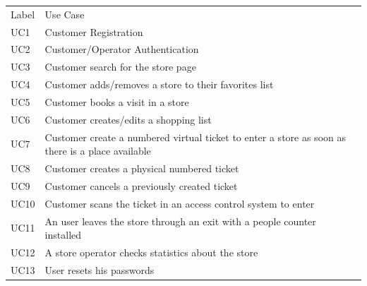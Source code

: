 \renewcommand{\arraystretch}{1.4}
\begin{tabular}{C{2cm}L{10.5cm}C{2.6cm}}
    Label & Use Case                                                                                         \\
    UC1   & Customer Registration                                                                            \\
    UC2   & Customer/Operator Authentication                                                                 \\
    UC3   & Customer search for the store page                                                               \\
    UC4   & Customer adds/removes a store to their favorites list                                            \\
    UC5   & Customer books a visit in a store                                                                \\
    UC6   & Customer creates/edits a shopping list                                                           \\
    UC7   & Customer create a numbered virtual ticket to enter a store as soon as there is a place available \\
    UC8   & Customer creates a physical numbered ticket                                                      \\
    UC9   & Customer cancels a previously created ticket                                                     \\
    UC10  & Customer scans the ticket in an access control system to enter                                   \\
    UC11  & An user leaves the store through an exit with a people counter installed                         \\
    UC12  & A store operator checks statistics about the store                                               \\
    UC13  & User resets his passwords                                                                        \\
\end{tabular}
\medskip
